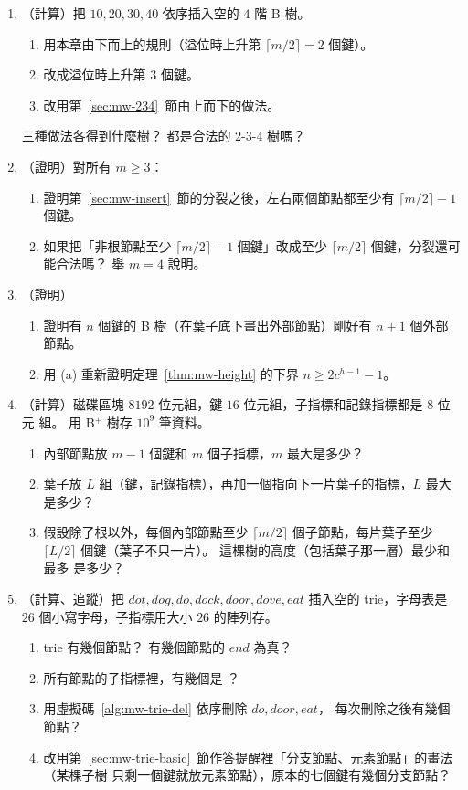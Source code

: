 \begin{enumerate}
\item （計算）把 $10, 20, 30, 40$ 依序插入空的 $4$ 階 B 樹。
\begin{enumerate}
\item 用本章由下而上的規則（溢位時上升第 $\lceil m/2 \rceil = 2$ 個鍵）。
\item 改成溢位時上升第 $3$ 個鍵。
\item 改用第~\ref{sec:mw-234}~節由上而下的做法。
\end{enumerate}
三種做法各得到什麼樹？ 都是合法的 2-3-4 樹嗎？

\item （證明）對所有 $m \ge 3$：
\begin{enumerate}
\item 證明第~\ref{sec:mw-insert}~節的分裂之後，左右兩個節點都至少有
$\lceil m/2 \rceil - 1$ 個鍵。
\item 如果把「非根節點至少 $\lceil m/2 \rceil - 1$ 個鍵」改成至少 $\lceil m/2 \rceil$
個鍵，分裂還可能合法嗎？ 舉 $m = 4$ 說明。
\end{enumerate}

\item （證明）
\begin{enumerate}
\item 證明有 $n$ 個鍵的 B 樹（在葉子底下畫出外部節點）剛好有 $n + 1$ 個外部節點。
\item 用 (a) 重新證明定理~\ref{thm:mw-height} 的下界 $n \ge 2c^{h-1} - 1$。
\end{enumerate}

\item （計算）磁碟區塊 $8192$ 位元組，鍵 $16$ 位元組，子指標和記錄指標都是 $8$ 位元
組。 用 B$^{+}$ 樹存 $10^9$ 筆資料。
\begin{enumerate}
\item 內部節點放 $m - 1$ 個鍵和 $m$ 個子指標，$m$ 最大是多少？
\item 葉子放 $L$ 組（鍵，記錄指標），再加一個指向下一片葉子的指標，$L$ 最大是多少？
\item 假設除了根以外，每個內部節點至少 $\lceil m/2 \rceil$ 個子節點，每片葉子至少
$\lceil L/2 \rceil$ 個鍵（葉子不只一片）。 這棵樹的高度（包括葉子那一層）最少和最多
是多少？
\end{enumerate}

\item （計算、追蹤）把 $\mathit{dot}, \mathit{dog}, \mathit{do}, \mathit{dock}, \mathit{door},
\mathit{dove}, \mathit{eat}$ 插入空的 trie，字母表是 $26$ 個小寫字母，子指標用大小 $26$
的陣列存。
\begin{enumerate}
\item trie 有幾個節點？ 有幾個節點的 $\mathit{end}$ 為真？
\item 所有節點的子指標裡，有幾個是 \NIL？
\item 用虛擬碼~\ref{alg:mw-trie-del} 依序刪除 $\mathit{do}, \mathit{door}, \mathit{eat}$，
每次刪除之後有幾個節點？
\item 改用第~\ref{sec:mw-trie-basic}~節作答提醒裡「分支節點、元素節點」的畫法（某棵子樹
只剩一個鍵就放元素節點），原本的七個鍵有幾個分支節點？
\end{enumerate}


\end{enumerate}
